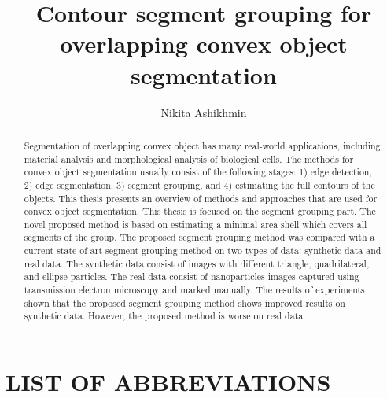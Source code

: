 \documentclass{lutmscthesis}[2010/09/22]
\title{Contour segment grouping for overlapping convex object segmentation}
\author{Nikita Ashikhmin}
\begin{document}

\maketitle
\newpage

\begin{abstract}
Segmentation of overlapping convex object has many real-world applications, including material analysis and morphological analysis of biological cells. The methods for convex object segmentation usually consist of the following stages: 1) edge detection, 2) edge segmentation, 3) segment grouping, and 4) estimating the full contours of the objects. 
This thesis presents an overview of methods and approaches that are used for convex object segmentation. This thesis is focused on the segment grouping part. The novel proposed method is based on estimating a minimal area shell which covers all segments of the group. The proposed segment grouping method was compared with a current state-of-art segment grouping method on two types of data: synthetic data and real data. The synthetic data consist of images with different triangle, quadrilateral, and ellipse particles. The real data consist of nanoparticles images captured using transmission electron microscopy and marked manually. The results of experiments shown that the proposed segment grouping method shows improved results on synthetic data. However, the proposed method is worse on real data.
\end{abstract}




\renewcommand\refname{REFERENCES}
\renewcommand\contentsname{CONTENTS}

\pagestyle{masters}
\newpage



\tableofcontents



\section*{LIST OF ABBREVIATIONS}
\end{document}
